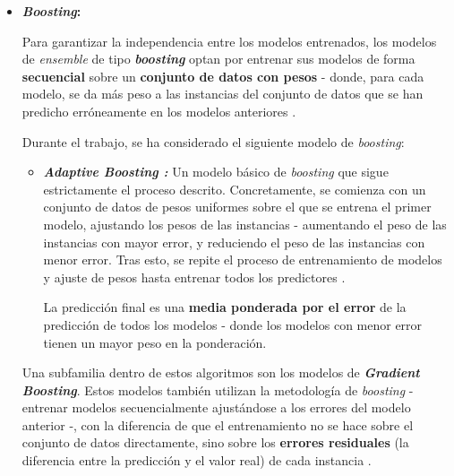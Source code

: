\begin{itemize}[leftmargin=*, parsep=2pt, itemsep=2pt, topsep=4pt]
	\item \textbf{\textit{Boosting}:}
	
	Para garantizar la independencia entre los modelos entrenados, los modelos de \textit{ensemble} de tipo \textbf{\textit{boosting}} optan por entrenar sus modelos de forma \textbf{secuencial} sobre un \textbf{conjunto de datos con pesos} - donde, para cada modelo, se da más peso a las instancias del conjunto de datos que se han predicho erróneamente en los modelos anteriores \cite{aima}.
	
	Durante el trabajo, se ha considerado el siguiente modelo de \textit{boosting}:
	
	\begin{itemize}[parsep=1pt, itemsep=1pt, topsep=4pt]
		\item \textbf{\textit{Adaptive Boosting \cite{adaboost}:}} Un modelo básico de \textit{boosting} que sigue estrictamente el proceso descrito. Concretamente, se comienza con un conjunto de datos de pesos uniformes sobre el que se entrena el primer modelo, ajustando los pesos de las instancias - aumentando el peso de las instancias con mayor error, y reduciendo el peso de las instancias con menor error. Tras esto, se repite el proceso de entrenamiento de modelos y ajuste de pesos hasta entrenar todos los predictores \cite{aima}.
		
		La predicción final es una \textbf{media ponderada por el error} de la predicción de todos los modelos - donde los modelos con menor error tienen un mayor peso en la ponderación.
	\end{itemize}
	
	Una subfamilia dentro de estos algoritmos son los modelos de \textbf{\textit{Gradient Boosting}}. Estos modelos también utilizan la metodología de \textit{boosting} - entrenar modelos secuencialmente ajustándose a los errores del modelo anterior -, con la diferencia de que el entrenamiento no se hace sobre el conjunto de datos directamente, sino sobre los \textbf{errores residuales} (la diferencia entre la predicción y el valor real) de cada instancia \cite{gradientboosting}. 
	

\end{itemize}
